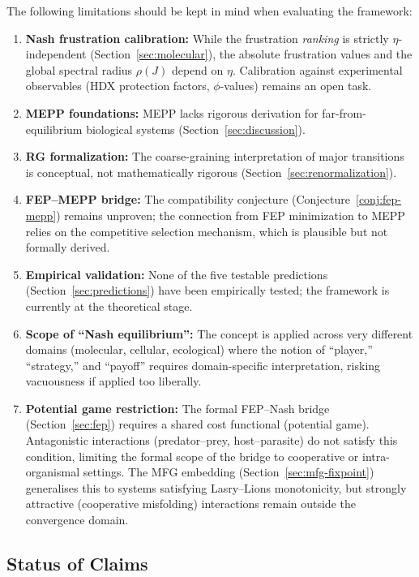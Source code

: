 \documentclass[12pt,a4paper]{article}
\theoremstyle{remark}
\begin{document}
The following limitations should be kept in mind when evaluating the framework:
\begin{enumerate}
    \item \textbf{Nash frustration calibration:} While the frustration \emph{ranking} is strictly $\eta$-independent (Section~\ref{sec:molecular}), the absolute frustration values and the global spectral radius $\rho(J)$ depend on $\eta$. Calibration against experimental observables (HDX protection factors, $\phi$-values) remains an open task.
    \item \textbf{MEPP foundations:} MEPP lacks rigorous derivation for far-from-equilibrium biological systems (Section~\ref{sec:discussion}).
    \item \textbf{RG formalization:} The coarse-graining interpretation of major transitions is conceptual, not mathematically rigorous (Section~\ref{sec:renormalization}).
    \item \textbf{FEP--MEPP bridge:} The compatibility conjecture (Conjecture~\ref{conj:fep-mepp}) remains unproven; the connection from FEP minimization to MEPP relies on the competitive selection mechanism, which is plausible but not formally derived.
    \item \textbf{Empirical validation:} None of the five testable predictions (Section~\ref{sec:predictions}) have been empirically tested; the framework is currently at the theoretical stage.
    \item \textbf{Scope of ``Nash equilibrium'':} The concept is applied across very different domains (molecular, cellular, ecological) where the notion of ``player,'' ``strategy,'' and ``payoff'' requires domain-specific interpretation, risking vacuousness if applied too liberally.
    \item \textbf{Potential game restriction:} The formal FEP--Nash bridge (Section~\ref{sec:fep}) requires a shared cost functional (potential game). Antagonistic interactions (predator--prey, host--parasite) do not satisfy this condition, limiting the formal scope of the bridge to cooperative or intra-organismal settings. The MFG embedding (Section~\ref{sec:mfg-fixpoint}) generalises this to systems satisfying Lasry--Lions monotonicity, but strongly attractive (cooperative misfolding) interactions remain outside the convergence domain.
\end{enumerate}

\subsection{Status of Claims}
\end{document}
